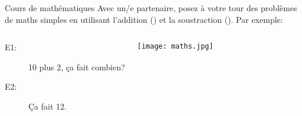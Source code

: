\begin{frame}{Cours de mathématiques}
  Avec un/e partenaire, posez à votre tour des problèmes de maths simples en utilisant l'addition () et la soustraction ().
  Par exemple: \\
  \begin{columns}
      \begin{description}
        \item[E1:] 10 plus 2, ça fait combien?
        \item[] 
        \item[E2:] Ça fait 12.
        \item[] 
      \end{description}
      \begin{center}
        \texttt{[image: maths.jpg]}
      \end{center}
  \end{columns}
\end{frame}